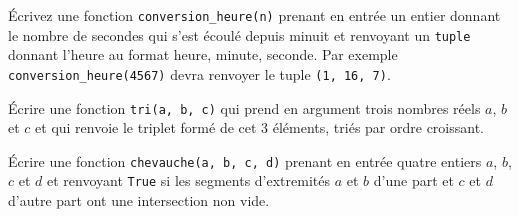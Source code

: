 \documentclass{magnoliaold}
\begin{document}


Écrivez une fonction \verb!conversion_heure(n)! prenant en entrée un entier donnant le
nombre de secondes qui s'est écoulé depuis minuit et renvoyant un \verb!tuple! donnant
l'heure au format heure, minute, seconde. Par exemple \verb!conversion_heure(4567)! devra
renvoyer le tuple \verb_(1, 16, 7)_.


Écrire une fonction \verb!tri(a, b, c)! qui prend en argument trois nombres réels $a$, $b$ et
$c$ et qui renvoie le triplet formé de cet 3 éléments, triés par ordre croissant.

Écrire une fonction \verb_chevauche(a, b, c, d)_ prenant en entrée quatre entiers $a$, $b$, $c$ et $d$
et renvoyant \verb_True_ si les segments d'extremités $a$ et $b$ d'une part et $c$ et $d$ d'autre part
ont une intersection non vide.








\end{document}
